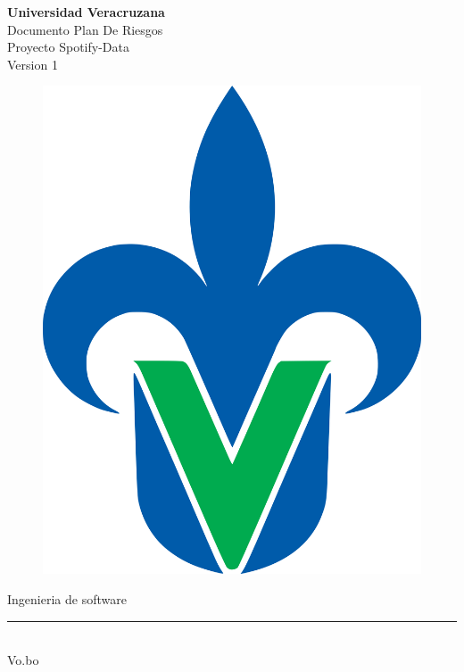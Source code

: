 \begin{titlepage}
	\begin{center}
	{\huge \textbf{Universidad Veracruzana}}\\
	\vspace{2cm}  
	{\Large {Documento Plan De Riesgos}}\\
	\vspace{5mm}	
	{\Large {Proyecto Spotify-Data}}\\
	\vspace{5mm}	
	{\Large {Version 1}}\\
	\vspace{1cm}	
	\begin{figure}[h]
		\centering
		\includegraphics[scale=0.10]{uvlogo}
	\end{figure}
	{\Large {Ingenieria de software}}\\
	\vspace{2cm}	
    \rule{8cm}{0.5mm} \\ \Large Vo.bo\\ 
	\end{center}
\end{titlepage}